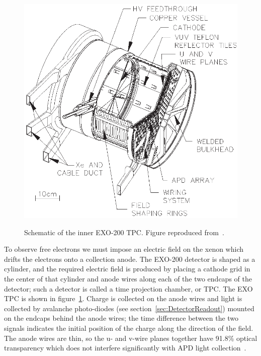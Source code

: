 \begin{figure}
\begin{center}
\includegraphics[keepaspectratio=true,width=\textwidth]{TPCSchematic.eps}
\end{center}
\renewcommand{\baselinestretch}{1}
\small\normalsize
\begin{quote}
\caption{Schematic of the inner EXO-200 TPC.  Figure reproduced from~\cite{detectorPartI}.}
\label{fig:TPCSchematic}
\end{quote}
\end{figure}
\renewcommand{\baselinestretch}{2}
\small\normalsize

To observe free electrons we must impose an electric field on the xenon which drifts the electrons onto a collection anode.  The EXO-200 detector is shaped as a cylinder, and the required electric field is produced by placing a cathode grid in the center of that cylinder and anode wires along each of the two endcaps of the detector; such a detector is called a time projection chamber, or TPC.  The EXO TPC is shown in figure~\ref{fig:TPCSchematic}.  Charge is collected on the anode wires and light is collected by avalanche photo-diodes (see section~\ref{sec:DetectorReadout}) mounted on the endcaps behind the anode wires; the time difference between the two signals indicates the initial position of the charge along the direction of the field. The anode wires are thin, so the u- and v-wire planes together have 91.8\% optical transparency which does not interfere significantly with APD light collection~\cite{detectorPartI}.


